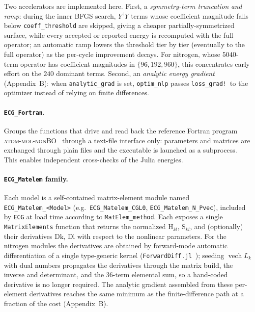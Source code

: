 \documentclass[11pt]{article}
\newcommand{\vech}{\operatorname{vech}}
\begin{document}
Two accelerators are implemented here. First, a \emph{symmetry-term
truncation and ramp}: during the inner BFGS search, $Y^{\dagger}Y$ terms whose
coefficient magnitude falls below \texttt{coeff\_threshold} are skipped, giving
a cheaper partially-symmetrized surface, while every accepted or reported
energy is recomputed with the full operator; an automatic ramp lowers the
threshold tier by tier (eventually to the full operator) as the per-cycle
improvement decays. For nitrogen, whose $5040$-term operator has coefficient
magnitudes in $\{96,192,960\}$, this concentrates early effort on the $240$
dominant terms. Second, an \emph{analytic energy gradient} (Appendix~B): when
\texttt{analytic\_grad} is set, \texttt{optim\_nlp} passes
\texttt{loss\_grad!}\ to the optimizer instead of relying on finite
differences.

\paragraph{\texttt{ECG\_Fortran}.}
Groups the functions that drive and read back the reference Fortran program
\textsc{atom-mol-nonBO}~\cite{ATOMMOLnonBO} through a text-file interface only:
parameters and matrices are exchanged through plain files and the executable is
launched as a subprocess. This enables independent cross-checks of the Julia
energies.

\paragraph{\texttt{ECG\_Matelem} family.}
Each model is a self-contained matrix-element module named
\texttt{ECG\_Matelem\_<Model>} (e.g.\ \texttt{ECG\_Matelem\_CGL0},
\texttt{ECG\_Matelem\_N\_Pvec}), included by \texttt{ECG} at load time according
to \texttt{MatElem\_method}. Each exposes a single \texttt{MatrixElements}
function that returns the normalized $\mathrm{H}_{kl}$, $\mathrm{S}_{kl}$, and
(optionally) their derivatives $\mathrm{Dk}$, $\mathrm{Dl}$ with respect to the
nonlinear parameters. For the nitrogen modules the derivatives are obtained by
forward-mode automatic differentiation of a single type-generic kernel
(\texttt{ForwardDiff.jl}~\cite{Revels2016}); seeding $\vech L_k$ with dual
numbers propagates the derivatives through the matrix build, the inverse and
determinant, and the $36$-term elemental sum, so a hand-coded derivative is no
longer required. The analytic gradient assembled from these per-element
derivatives reaches the same minimum as the finite-difference path at a fraction
of the cost (Appendix~B).
\end{document}
